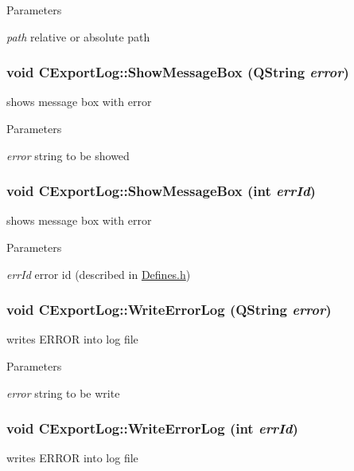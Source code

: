 \begin{DoxyParams}{Parameters}
\item[{\em path}]relative or absolute path \end{DoxyParams}
\hypertarget{classCExportLog_a3cab18e4b751b54e26ad62c60c71ec93}{
\subsubsection[{ShowMessageBox}]{\setlength{\rightskip}{0pt plus 5cm}void CExportLog::ShowMessageBox (QString {\em error})}}
\label{classCExportLog_a3cab18e4b751b54e26ad62c60c71ec93}
shows message box with error


\begin{DoxyParams}{Parameters}
\item[{\em error}]string to be showed \end{DoxyParams}
\hypertarget{classCExportLog_af21ab4e7ccfcc193bbb6cfe48afb8a44}{
\subsubsection[{ShowMessageBox}]{\setlength{\rightskip}{0pt plus 5cm}void CExportLog::ShowMessageBox (int {\em errId})}}
\label{classCExportLog_af21ab4e7ccfcc193bbb6cfe48afb8a44}
shows message box with error


\begin{DoxyParams}{Parameters}
\item[{\em errId}]error id (described in \hyperlink{Defines_8h_source}{Defines.h}) \end{DoxyParams}
\hypertarget{classCExportLog_ad316dacdee3ef0fb2ee34e17b56743ca}{
\subsubsection[{WriteErrorLog}]{\setlength{\rightskip}{0pt plus 5cm}void CExportLog::WriteErrorLog (QString {\em error})}}
\label{classCExportLog_ad316dacdee3ef0fb2ee34e17b56743ca}
writes ERROR into log file


\begin{DoxyParams}{Parameters}
\item[{\em error}]string to be write \end{DoxyParams}
\hypertarget{classCExportLog_aedda889f4345c0fb94691fe20eee643f}{
\subsubsection[{WriteErrorLog}]{\setlength{\rightskip}{0pt plus 5cm}void CExportLog::WriteErrorLog (int {\em errId})}}
\label{classCExportLog_aedda889f4345c0fb94691fe20eee643f}
writes ERROR into log file


